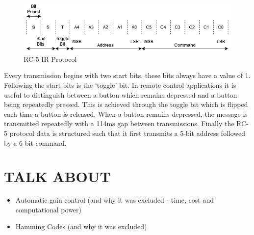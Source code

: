 \begin{figure}[H]
	\centering
	\includegraphics[width=0.8\linewidth]{figures/litreview/rc5_protocol.png}
	\caption{RC-5 IR Protocol}
	\label{fig:rc_5_protocol}
\end{figure}

Every transmission begins with two start bits, these bits always have a value of 1. Following the start bits is the `toggle' bit. In remote control applications it is useful to distinguish between a button which remains depressed and a button being repeatedly pressed. This is achieved through the toggle bit which is flipped each time a button is released. When a button remains depressed, the message is transmitted repeatedly with a 114ms gap between transmissions. Finally the RC-5 protocol data is structured such that it first transmits a 5-bit address followed by a 6-bit command.






\section{TALK ABOUT}
\begin{itemize}
	\item Automatic gain control (and why it was excluded - time, cost and computational power)
	\item Hamming Codes (and why it was excluded)
\end{itemize}







